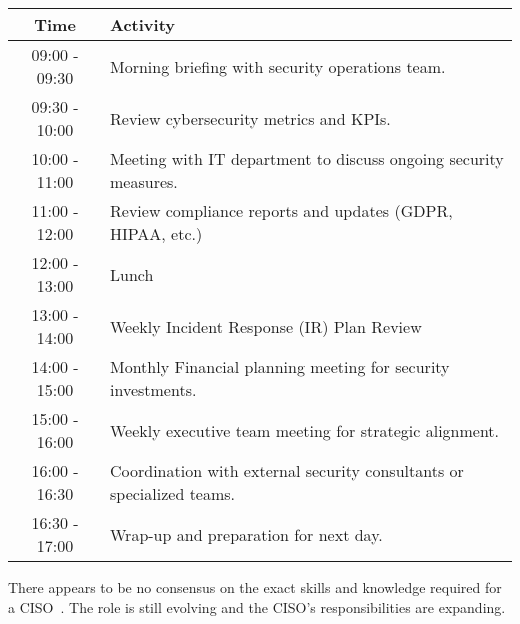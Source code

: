 \begin{table}[h]
  \centering
  \begin{tabularx}{\linewidth}{|c|X|}
    \hline
    Time & Activity \\
    \hline
    09:00 - 09:30 & Morning briefing with security operations team. \\
    \hline
    09:30 - 10:00 & Review cybersecurity metrics and KPIs. \\
    \hline
    10:00 - 11:00 & Meeting with IT department to discuss ongoing security measures. \\
    \hline
    11:00 - 12:00 & Review compliance reports and updates (GDPR, HIPAA, etc.) \\
    \hline
    12:00 - 13:00 & Lunch \\
    \hline
    13:00 - 14:00 & Weekly Incident Response (IR) Plan Review \\
    \hline
    14:00 - 15:00 & Monthly Financial planning meeting for security investments. \\
    \hline
    15:00 - 16:00 & Weekly executive team meeting for strategic alignment. \\
    \hline
    16:00 - 16:30 & Coordination with external security consultants or specialized teams. \\
    \hline
    16:30 - 17:00 & Wrap-up and preparation for next day. \\
    \hline
  \end{tabularx}
\end{table}

There appears to be no consensus on the exact skills and knowledge required for a CISO~\cite{cotton}.
The role is still evolving and the CISO's responsibilities are expanding.

